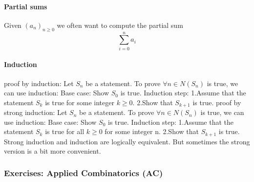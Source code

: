 \documentclass{article}
\begin{document}
\paragraph{Partial sums}
Given $(a_n)_{n\ge 0}$ we often want to compute the partial sum $$\sum_{i=0}^na_i$$
\paragraph{Induction}
proof by induction:\newline
Let $S_n$ be a statement. To prove $\forall n \in N(S_n)$ is true, we can use induction:\newline
Base case: Show $S_0$ is true.\newline
Induction step:\newline
1.Assume that the statement $S_k$ is true for some integer
$k\ge 0$.\newline
2.Show that $S_{k+1}$ is true.\newline
proof by strong induction:\newline
Let $S_n$ be a statement. To prove $\forall n \in N(S_n)$ is true, we can use induction:\newline
Base case: Show $S_0$ is true.\newline
Induction step:\newline
1.Assume that the statement $S_k$ is true for all
$k\ge 0$ for some integer n.\newline
2.Show that $S_{k+1}$ is true.\newline
Strong induction and induction are logically equivalent. But
sometimes the strong version is a bit more convenient.
\subsubsection{Exercises: Applied Combinatorics (AC)}
\end{document}
